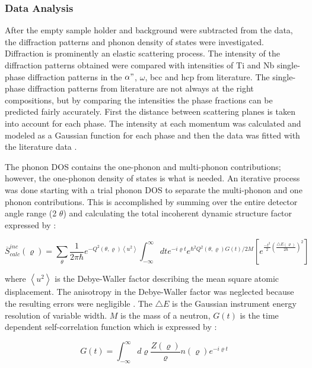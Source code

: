 \subsubsection{Data Analysis}

After the empty sample holder and background were subtracted from the data, the diffraction patterns and phonon density of states were investigated. Diffraction is prominently an elastic scattering process. The intensity of the diffraction patterns obtained were compared with intensities of Ti and Nb single-phase diffraction patterns in the $\alpha"$, $\omega$, bcc and hcp from literature. The single-phase diffraction patterns from literature are not always at the right compositions, but by comparing the intensities the phase fractions can be predicted fairly accurately. First the distance between scattering planes is taken into account for each phase. The intensity at each momentum was calculated and modeled as a Gaussian function for each phase and then the data was fitted with the literature data \cite{Young1998,Toraya1986}. 

The phonon DOS contains the one-phonon and multi-phonon contributions; however, the one-phonon density of states is what is needed. An iterative process was done starting with a trial phonon DOS to separate the multi-phonon and one phonon contributions. This is accomplished by summing over the entire detector angle range (2 $\theta$) and calculating the total incoherent dynamic structure factor expressed by \cite{Manley2001}:

\begin{equation}
\label{eq: td_dynstrufac}
\overline{S}_{calc}^{inc} (\varrho) = \sum_{\theta} \frac{1}{2 \pi \hbar} e^{- Q^{2} (\theta, \varrho) \left<u^{2} \right>} \int_{-\infty}^{\infty} dte^{-i \varrho t} e^{\hbar^{2}Q^{2}(\theta, \varrho) G(t)/2M} \left[ e^{\frac{-t^{2}}{2} \left(\frac{\bigtriangleup E (\varrho)}{2\hbar} \right)^{2}} \right]
\end{equation}

\noindent where $\left< u^{2} \right>$  is the Debye-Waller factor describing the mean square atomic displacement. The anisotropy in the Debye-Waller factor was neglected because the resulting errors were negligible \cite{Manley2001}. The $\bigtriangleup E$ is the Gaussian instrument energy resolution of variable width. $M$ is the mass of a neutron, $G(t)$ is the time dependent self-correlation function which is expressed by \cite{Manley2001}:

\begin{equation}
\label{eq: td_selfcorrelation}
G (t) = \int_{- \infty}^{\infty} d \varrho \frac{Z(\varrho)}{\varrho} n(\varrho) e^{- i \varrho t}
\end{equation}

